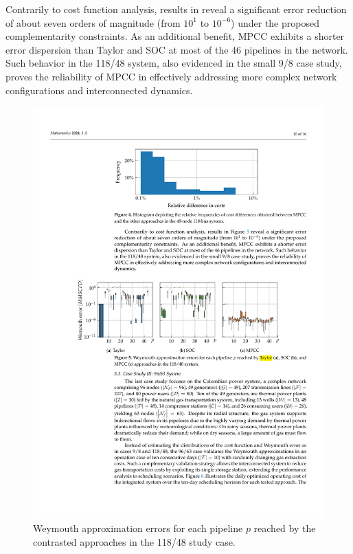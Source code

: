 Contrarily to cost function analysis, results in  reveal a significant error reduction of about seven orders of magnitude (from $10^1$ to $10^{-6}$) under the proposed complementarity constraints. As an additional benefit, MPCC exhibits a shorter error dispersion than Taylor and SOC at most of the 46 pipelines in the network. Such behavior in the 118/48 system, also evidenced in the small 9/8 case study, proves the reliability of MPCC in effectively addressing more complex network configurations and interconnected dynamics.


\vspace{-6pt}
\begin{figure}[H]
\centering    
    \includegraphics[scale=1.05]{figures/Chapter_MPCC/g004.pdf}
\caption{Weymouth approximation errors for each pipeline $p$ reached by the contrasted approaches in the 118/48 study case.} 
\label{fig:green_test_error}
\end{figure}

